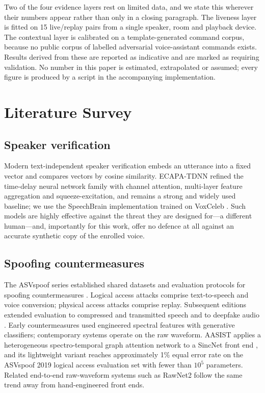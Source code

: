 \documentclass[conference]{IEEEtran}
\begin{document}
Two of the four evidence layers rest on limited data, and we state this
wherever their numbers appear rather than only in a closing paragraph. The
liveness layer is fitted on 15 live/replay pairs from a single speaker, room
and playback device. The contextual layer is calibrated on a
template-generated command corpus, because no public corpus of labelled
adversarial voice-assistant commands exists. Results derived from these are
reported as indicative and are marked as requiring validation. No number in
this paper is estimated, extrapolated or assumed; every figure is produced by
a script in the accompanying implementation.

\section{Literature Survey}

\subsection{Speaker verification}
Modern text-independent speaker verification embeds an utterance into a fixed
vector and compares vectors by cosine similarity. ECAPA-TDNN
\cite{desplanques2020ecapa} refined the time-delay neural network family with
channel attention, multi-layer feature aggregation and squeeze-excitation, and
remains a strong and widely used baseline; we use the SpeechBrain
implementation \cite{ravanelli2021speechbrain} trained on VoxCeleb
\cite{nagrani2017voxceleb}. Such models are highly effective against the threat
they are designed for---a different human---and, importantly for this work,
offer no defence at all against an accurate synthetic copy of the enrolled
voice.

\subsection{Spoofing countermeasures}
The ASVspoof series established shared datasets and evaluation protocols for
spoofing countermeasures \cite{todisco2019asvspoof,wang2020asvspoof}. Logical
access attacks comprise text-to-speech and voice conversion; physical access
attacks comprise replay. Subsequent editions extended evaluation to compressed
and transmitted speech and to deepfake audio \cite{yamagishi2021asvspoof}. Early countermeasures used engineered spectral
features with generative classifiers; contemporary systems operate on the raw
waveform. AASIST \cite{jung2022aasist} applies a heterogeneous spectro-temporal
graph attention network to a SincNet front end \cite{ravanelli2018sincnet}, and
its lightweight variant reaches approximately 1\% equal error rate on the
ASVspoof 2019 logical access evaluation set with fewer than $10^5$ parameters.
Related end-to-end raw-waveform systems such as RawNet2 \cite{tak2021rawnet}
follow the same trend away from hand-engineered front ends.
\end{document}
